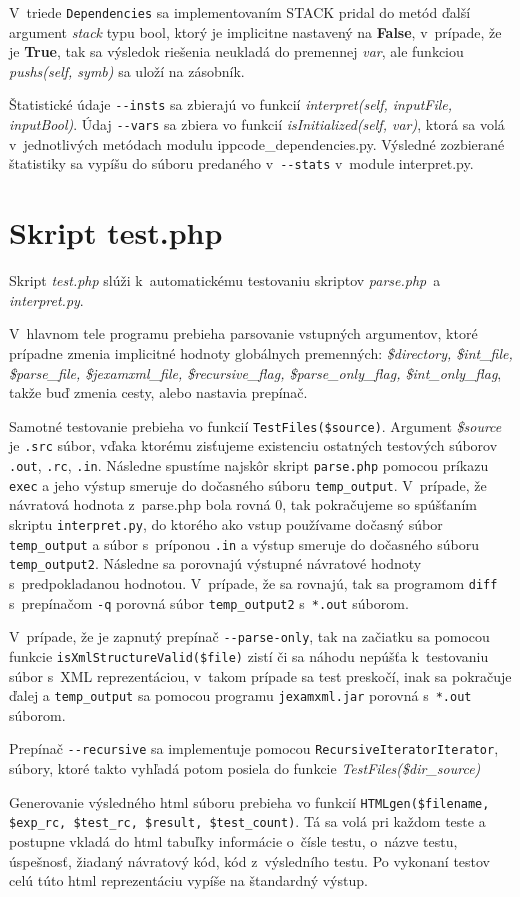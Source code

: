 \documentclass[11pt, a4paper]{article}
\begin{document}
	V~triede \texttt{Dependencies} sa implementovaním STACK pridal do metód ďalší argument \emph{stack} typu bool, ktorý je implicitne nastavený na \textbf{False}, v~prípade, že je \textbf{True}, tak sa výsledok riešenia neukladá do premennej \emph{var}, ale funkciou \emph{pushs(self, symb)} sa uloží na zásobník.
	
	Štatistické údaje \texttt{-{-}insts} sa zbierajú vo funkcií \emph{interpret(self, inputFile, inputBool)}. Údaj \texttt{-{-}vars} sa zbiera vo funkcií \emph{isInitialized(self, var)}, ktorá sa volá v~jednotlivých metódach modulu ippcode\_dependencies.py. Výsledné zozbierané štatistiky sa vypíšu do súboru predaného v~\texttt{-{-}stats} v~module interpret.py.
	
	\section{Skript test.php}
	Skript \emph{test.php} slúži k~automatickému testovaniu skriptov \emph{parse.php} a \emph{interpret.py}. 
	
	V~hlavnom tele programu prebieha parsovanie vstupných argumentov, ktoré prípadne zmenia implicitné hodnoty globálnych premenných: \emph{\$directory, \$int\_file, \$parse\_file, \$jexamxml\_file, \$recursive\_flag, \$parse\_on\-ly\_flag, \$int\_only\_flag}, takže buď zmenia cesty, alebo nastavia prepínač.
	
	Samotné testovanie prebieha vo funkcií \texttt{TestFiles(\$source)}. Argument \emph{\$source} je \texttt{.src} súbor, vďaka ktorému zisťujeme existenciu ostatných testových súborov \texttt{.out}, \texttt{.rc}, \texttt{.in}. Následne spustíme najskôr skript \texttt{parse.php} pomocou príkazu \texttt{exec} a jeho výstup smeruje do dočasného súboru \texttt{temp\_output}. V~prípade, že návratová hodnota z~parse.php bola rovná 0, tak pokračujeme so spúšťaním skriptu \texttt{inter\-pret.py}, do ktorého ako vstup používame dočasný súbor \texttt{temp\_output} a súbor s~príponou \texttt{.in} a výstup smeruje do dočasného súboru \texttt{temp\_output2}. Následne sa porovnajú výstupné návratové hodnoty s~predpokladanou hodnotou. V~prípade, že sa rovnajú, tak sa programom \texttt{diff} s~prepínačom \texttt{-q} porovná súbor \texttt{temp\_output2} s~\texttt{*.out} súborom.
	
	V~prípade, že je zapnutý prepínač \texttt{-{-}parse-only}, tak na začiatku sa pomocou funkcie \texttt{is\-Xml\-Stru\-ctu\-re\-Valid(\$file)} zistí či sa náhodu nepúšťa k~testovaniu súbor s~XML reprezentáciou, v~takom prípade sa test preskočí, inak sa pokračuje ďalej a \texttt{temp\_output} sa pomocou programu \texttt{jexamxml.jar} porovná s~\texttt{*.out} súborom.
	
	Prepínač \texttt{-{-}recursive} sa implementuje pomocou \texttt{RecursiveIteratorIterator}, súbory, ktoré takto vyhľadá potom posiela do funkcie \emph{TestFiles(\$dir\_source)}
	
	Generovanie výsledného html súboru prebieha vo funkcií \texttt{HTMLgen(\$filename,\-\,\$exp\_rc\-,\-\,\$\-test\_\-rc,\,\$result,\-\,\$test\_count)}. Tá sa volá pri každom teste a postupne vkladá do html tabuľky informácie o~čísle testu, o~názve testu, úspešnosť, žiadaný návratový kód, kód z~výsledního testu. Po vykonaní testov celú túto html reprezentáciu vypíše na štandardný výstup.
	
\end{document}
